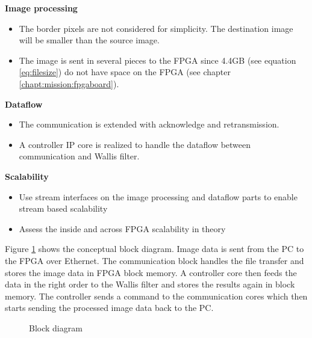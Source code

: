 \textbf{Image processing}
    \begin{itemize}
        \item The border pixels are not considered for simplicity. The destination image will be smaller than the source image.
        \item The image is sent in several pieces to the FPGA since 4.4GB 
        (see equation \ref{eq:filesize}) do not have space on the FPGA (see chapter \ref{chapt:mission:fpgaboard}).
    \end{itemize}

\textbf{Dataflow}
    \begin{itemize}
        \item The communication is extended with acknowledge and retransmission.
        \item A controller IP core is realized to handle the dataflow between
        communication and Wallis filter.
    \end{itemize}

\textbf{Scalability}
    \begin{itemize}
        \item Use stream interfaces on the image processing and dataflow parts
        to enable stream based scalability
        \item Assess the inside and across FPGA scalability in theory
    \end{itemize}


Figure \ref{fig:blockdiagram} shows the conceptual block diagram. Image data is
sent from the PC to the FPGA over Ethernet. The communication block handles the
file transfer and stores the image data in FPGA block memory. A controller core
then feeds the data in the right order to the Wallis filter and stores the
results again in block memory. The controller sends a command to the
communication cores which then starts sending the processed image data back to
the PC.

\begin{figure}[b!]
    \centering
    
    \caption{Block diagram}
    \label{fig:blockdiagram}
\end{figure}


